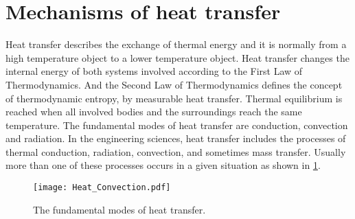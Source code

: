 \section{Mechanisms of heat transfer}
\noindent
Heat transfer describes the exchange of thermal energy and it is normally from a high temperature object to a lower temperature object.
Heat transfer changes the internal energy of both systems involved according to the First Law of Thermodynamics.
And the Second Law of Thermodynamics defines the concept of thermodynamic entropy, by measurable heat transfer.
Thermal equilibrium is reached when all involved bodies and the surroundings reach the same temperature.
The fundamental modes of heat transfer are conduction, convection and radiation.
In the engineering sciences, heat transfer includes the processes of thermal conduction, radiation, convection, and sometimes mass transfer.
Usually more than one of these processes occurs in a given situation as shown in \ref{Fig:HeatTransfer}.
\begin{figure}[!htp]
	\centering
	\texttt{[image: Heat\_Convection.pdf]}
	\caption{The fundamental modes of heat transfer.}
	\label{Fig:HeatTransfer}
\end{figure}

